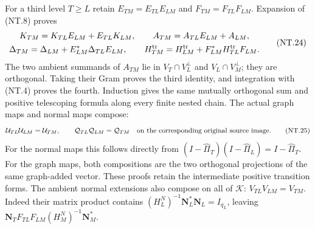 For a third level $T\ge L$ retain
$E_{TM}=E_{TL}E_{LM}$ and $F_{TM}=F_{TL}F_{LM}$.
Expansion of (NT.8) proves
\[
 \begin{gathered}
 K_{TM}=K_{TL}E_{LM}+E_{TL}K_{LM},\qquad
 A_{TM}=A_{TL}E_{LM}+A_{LM},\\
 \Delta_{TM}=\Delta_{LM}+E_{LM}^*\Delta_{TL}E_{LM},\qquad
 H_{TM}^{\rm tr}=H_{LM}^{\rm tr}+F_{LM}^*H_{TL}^{\rm tr}F_{LM}.
 \end{gathered}
 \tag{NT.24}
\]
The two ambient summands of $A_{TM}$ lie in
$V_T\cap V_L^\perp$ and $V_L\cap V_M^\perp$;
they are orthogonal. Taking their Gram proves the third identity,
and integration with (NT.4) proves the fourth. Induction gives
the same mutually orthogonal sum and positive telescoping formula
along every finite nested chain. The actual graph maps and normal
maps compose:
\[
 \mathcal U_{TL}\mathcal U_{LM}=\mathcal U_{TM},\qquad
 \mathcal Q_{TL}\mathcal Q_{LM}=\mathcal Q_{TM}
            \quad\hbox{on the corresponding original source image}.
 \tag{NT.25}
\]
For the normal maps this follows directly from
$(I-\widehat\Pi_T)(I-\widehat\Pi_L)=I-\widehat\Pi_T$.
For the graph maps, both compositions are the two orthogonal
projections of the same graph-added vector. These proofs retain
the intermediate positive transition forms.
The ambient normal extensions also compose on all of $\mathscr K$:
$V_{TL}V_{LM}=V_{TM}$. Indeed their matrix product contains
$(H_L^N)^{-1}\mathbf N_L^*\mathbf N_L=I_{q_L}$, leaving
$\mathbf N_TF_{TL}F_{LM}(H_M^N)^{-1}\mathbf N_M^*$.

